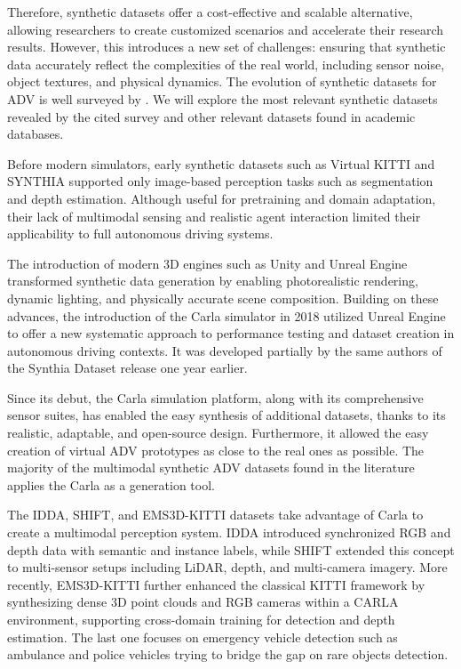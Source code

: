 Therefore, synthetic datasets offer a cost-effective and scalable alternative, allowing researchers to create customized scenarios and accelerate their research results. However, this introduces a new set of challenges: ensuring that synthetic data accurately reflect the complexities of the real world, including sensor noise, object textures, and physical dynamics. The evolution of synthetic datasets for ADV is well surveyed by \cite{song2024}. We will explore the most relevant synthetic datasets revealed by the cited survey and other relevant datasets found in academic databases.

Before modern simulators, early synthetic datasets such as Virtual KITTI \cite{Virtual_kitti} and SYNTHIA \cite{Ros_2016_CVPR} supported only image-based perception tasks such as segmentation and depth estimation. Although useful for pretraining and domain adaptation, their lack of multimodal sensing and realistic agent interaction limited their applicability to full autonomous driving systems.

The introduction of modern 3D engines such as Unity \cite{unity_engine} and Unreal Engine \cite{unreal_engine} transformed synthetic data generation by enabling photorealistic rendering, dynamic lighting, and physically accurate scene composition. Building on these advances, the introduction of the Carla simulator \cite{Dosovitskiy2017} in 2018 utilized Unreal Engine to offer a new systematic approach to performance testing and dataset creation in autonomous driving contexts. It was developed partially by the same authors of the Synthia Dataset release one year earlier. 

Since its debut, the Carla simulation platform, along with its comprehensive sensor suites, has enabled the easy synthesis of additional datasets, thanks to its realistic, adaptable, and open-source design. Furthermore, it allowed the easy creation of virtual ADV prototypes as close to the real ones as possible. The majority of the  multimodal synthetic ADV datasets found in the literature applies the Carla as a generation tool.

The IDDA, SHIFT, and EMS3D-KITTI datasets take advantage of Carla to create a multimodal perception system. IDDA \cite{Alberti2020Idda:Driving} introduced synchronized RGB and depth data with semantic and instance labels, while SHIFT \cite{Sun2022SHIFT:Adaptation} extended this concept to multi-sensor setups including LiDAR, depth, and multi-camera imagery. More recently, EMS3D-KITTI \cite{Jaiswal2025EMS3D-KITTI:Training} further enhanced the classical KITTI framework by synthesizing dense 3D point clouds and RGB cameras within a CARLA environment, supporting cross-domain training for detection and depth estimation. The last one focuses on emergency vehicle detection such as ambulance and police vehicles trying to bridge the gap on rare objects detection.


